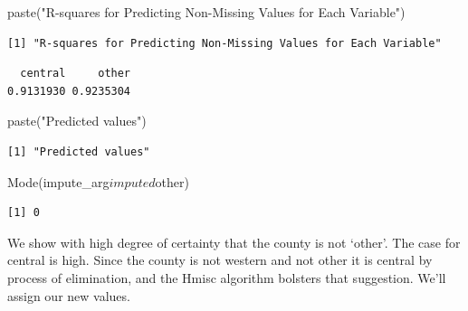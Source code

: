 \documentclass[]{article}
\newenvironment{Shaded}{}{}
\newcommand{\KeywordTok}[1]{\textcolor[rgb]{0.00,0.00,1.00}{#1}}
\newcommand{\NormalTok}[1]{#1}
\newcommand{\OperatorTok}[1]{#1}
\newcommand{\StringTok}[1]{\textcolor[rgb]{0.00,0.50,0.50}{#1}}
\begin{document}
\begin{Shaded}
\begin{Highlighting}[]
\KeywordTok{paste}\NormalTok{(}\StringTok{"R-squares for Predicting Non-Missing Values for Each Variable"}\NormalTok{)}
\end{Highlighting}
\end{Shaded}

\begin{verbatim}
[1] "R-squares for Predicting Non-Missing Values for Each Variable"
\end{verbatim}

\begin{Shaded}
\end{Shaded}

\begin{verbatim}
  central     other 
0.9131930 0.9235304 
\end{verbatim}

\begin{Shaded}
\begin{Highlighting}[]
\KeywordTok{paste}\NormalTok{(}\StringTok{"Predicted values"}\NormalTok{)}
\end{Highlighting}
\end{Shaded}

\begin{verbatim}
[1] "Predicted values"
\end{verbatim}

\begin{Shaded}
\begin{Highlighting}[]
\KeywordTok{Mode}\NormalTok{(impute_arg}\OperatorTok{$}\NormalTok{imputed}\OperatorTok{$}\NormalTok{other)}
\end{Highlighting}
\end{Shaded}

\begin{verbatim}
[1] 0
\end{verbatim}

We show with high degree of certainty that the county is not `other'.
The case for central is high. Since the county is not western and not
other it is central by process of elimination, and the Hmisc algorithm
bolsters that suggestion. We'll assign our new values.
\end{document}
